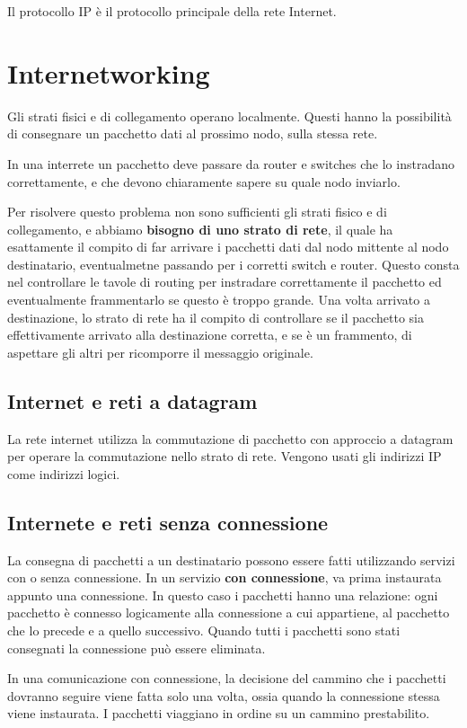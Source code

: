 Il protocollo IP è il protocollo principale della rete Internet.

\section{Internetworking}
    Gli strati fisici e di collegamento operano localmente. Questi hanno la possibilità di consegnare un pacchetto dati al prossimo nodo, sulla stessa rete.
    
    In una interrete un pacchetto deve passare da router e switches che lo instradano correttamente, e che devono chiaramente sapere su quale nodo inviarlo.
    
    Per risolvere questo problema non sono sufficienti gli strati fisico e di collegamento, e abbiamo \textbf{bisogno di uno strato di rete}, il quale ha esattamente il compito di far arrivare i pacchetti dati dal nodo mittente al nodo destinatario, eventualmetne passando per i corretti switch e router. Questo consta nel controllare le tavole di routing per instradare correttamente il pacchetto ed eventualmente frammentarlo se questo è troppo grande. Una volta arrivato a destinazione, lo strato di rete ha il compito di controllare se il pacchetto sia effettivamente arrivato alla destinazione corretta, e se è un frammento, di aspettare gli altri per ricomporre il messaggio originale.
    
    \subsection{Internet e reti a datagram}
        La rete internet utilizza la commutazione di pacchetto con approccio a datagram per operare la commutazione nello strato di rete. Vengono usati gli indirizzi IP come indirizzi logici.
        
    \subsection{Internete e reti senza connessione}
        La consegna di pacchetti a un destinatario possono essere fatti utilizzando servizi con o senza connessione. In un servizio \textbf{con connessione}, va prima instaurata appunto una connessione. In questo caso i pacchetti hanno una relazione: ogni pacchetto è connesso logicamente alla connessione a cui appartiene, al pacchetto che lo precede e a quello successivo. Quando tutti i pacchetti sono stati consegnati la connessione può essere eliminata.
        
        In una comunicazione con connessione, la decisione del cammino che i pacchetti dovranno seguire viene fatta solo una volta, ossia quando la connessione stessa viene instaurata. I pacchetti viaggiano in ordine su un cammino prestabilito.
        
